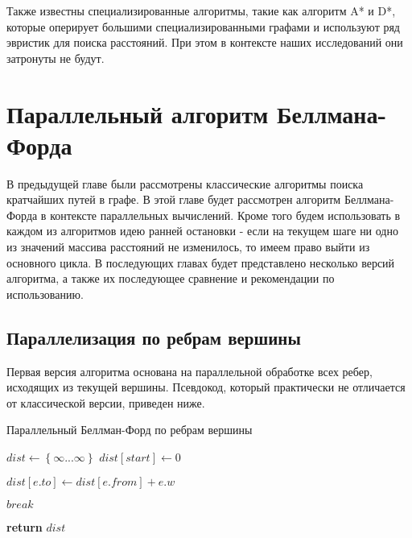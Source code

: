 Также известны специализированные алгоритмы, такие как алгоритм A* и D*, которые оперирует большими специализированными графами и используют ряд эвристик для поиска расстояний. При этом в контексте наших исследований они затронуты не будут.

\FloatBarrier
\section{Параллельный алгоритм Беллмана-Форда}

В предыдущей главе были рассмотрены классические алгоритмы поиска кратчайших путей в графе. В этой главе будет рассмотрен алгоритм Беллмана-Форда в контексте параллельных вычислений. Кроме того будем использовать в каждом из алгоритмов идею ранней остановки - если на текущем шаге ни одно из значений массива расстояний не изменилось, то имеем право выйти из основного цикла. В последующих главах будет представлено несколько версий алгоритма, а также их последующее сравнение и рекомендации по использованию.  

\FloatBarrier
\subsection{Параллелизация по ребрам вершины}
Первая версия алгоритма основана на параллельной обработке всех ребер, исходящих из текущей вершины. Псевдокод, который практически не отличается от классической версии, приведен ниже. 


\FloatBarrier
\begin{algorithm}
\caption{Параллельный Беллман-Форд по ребрам вершины}\label{bf_classic_par1}
\begin{algorithmic}[1]
\State $dist\gets \left\{ {\infty ... \infty}\right\}$
\State $dist[start] \gets 0$
 
		\algrenewcommand{}
				\State $dist[e.to] \gets dist[e.from] + e.w$
			\EndIf
		\EndFor	
		\algrenewcommand{}

	\EndFor
		\State $break$
	\EndIf

\EndFor
\State \textbf{return} $dist$
\EndProcedure
\end{algorithmic}
\end{algorithm}

